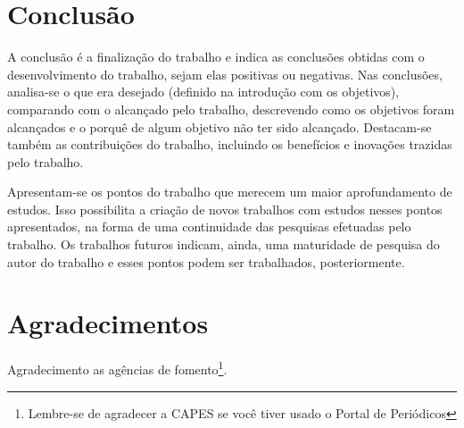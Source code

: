 \documentclass[12pt]{article}
\begin{document}
	\section{Conclusão}
	\label{sec_conclusao}
	
	A conclusão é a finalização do trabalho e indica as conclusões obtidas com o desenvolvimento do trabalho, sejam elas positivas ou negativas. Nas conclusões, analisa-se o que era desejado (definido na introdução com os objetivos), comparando com o alcançado pelo trabalho, descrevendo como os objetivos foram alcançados e o porquê de algum objetivo não ter sido alcançado. Destacam-se também as contribuições do trabalho, incluindo os benefícios e inovações trazidas pelo trabalho.
	
	Apresentam-se os pontos do trabalho que merecem um maior aprofundamento de estudos. Isso possibilita a criação de novos trabalhos com estudos nesses pontos apresentados, na forma de uma continuidade das pesquisas efetuadas pelo trabalho. Os trabalhos futuros indicam, ainda, uma maturidade de pesquisa do autor do trabalho e esses pontos podem ser trabalhados, posteriormente.
	
	\section*{Agradecimentos}
	Agradecimento as agências de fomento\footnote{Lembre-se de agradecer a CAPES se você tiver usado o Portal de Periódicos}.
	
    
	
	
\end{document}
